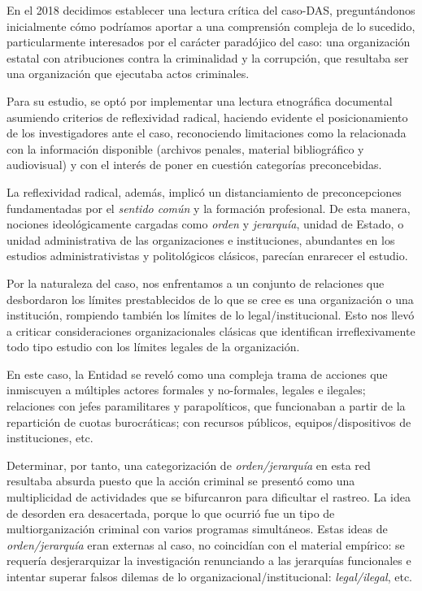 \documentclass[
  spanish,
  11pt,
  a4paper,
]{scrbook}
\begin{document}
En el 2018 decidimos establecer una lectura crítica del caso-DAS,
preguntándonos inicialmente cómo podríamos aportar a una comprensión
compleja de lo sucedido, particularmente interesados por el carácter
paradójico del caso: una organización estatal con atribuciones contra la
criminalidad y la corrupción, que resultaba ser una organización que
ejecutaba actos criminales.

Para su estudio, se optó por implementar una lectura etnográfica
documental \autocite{Wall2015} asumiendo criterios de reflexividad
radical, haciendo evidente el posicionamiento de los investigadores ante
el caso, reconociendo limitaciones como la relacionada con la
información disponible (archivos penales, material bibliográfico y
audiovisual) y con el interés de poner en cuestión categorías
preconcebidas.

La reflexividad radical, además, implicó un distanciamiento de
preconcepciones fundamentadas por el \emph{sentido común} y la formación
profesional. De esta manera, nociones ideológicamente cargadas como
\emph{orden} y \emph{jerarquía}, unidad de Estado, o unidad
administrativa de las organizaciones e instituciones, abundantes en los
estudios administrativistas y politológicos clásicos, parecían enrarecer
el estudio.

Por la naturaleza del caso, nos enfrentamos a un conjunto de relaciones
que desbordaron los límites prestablecidos de lo que se cree es una
organización o una institución, rompiendo también los límites de lo
legal/institucional. Esto nos llevó a criticar consideraciones
organizacionales clásicas que identifican irreflexivamente todo tipo
estudio con los límites legales de la organización.

En este caso, la Entidad se reveló como una compleja trama de acciones
que inmiscuyen a múltiples actores formales y no-formales, legales e
ilegales; relaciones con jefes paramilitares y parapolíticos, que
funcionaban a partir de la repartición de cuotas burocráticas; con
recursos públicos, equipos/dispositivos de instituciones, etc.

Determinar, por tanto, una categorización de \emph{orden/jerarquía} en
esta red resultaba absurda puesto que la acción criminal se presentó
como una multiplicidad de actividades que se bifurcanron para dificultar
el rastreo. La idea de desorden era desacertada, porque lo que ocurrió
fue un tipo de multiorganización criminal con varios programas
simultáneos. Estas ideas de \emph{orden/jerarquía} eran externas al
caso, no coincidían con el material empírico: se requería desjerarquizar
la investigación renunciando a las jerarquías funcionales e intentar
superar falsos dilemas de lo organizacional/institucional:
\emph{legal/ilegal}, etc.
\end{document}
